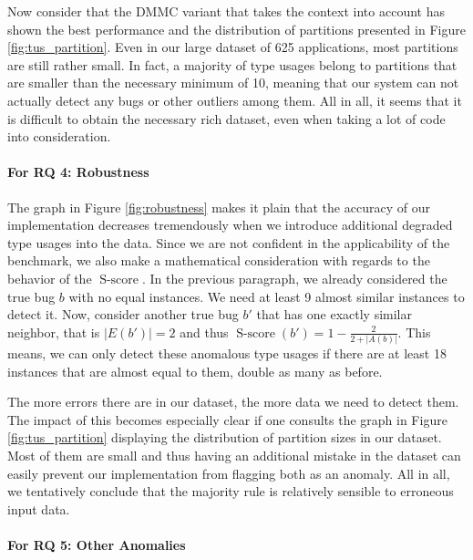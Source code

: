 Now consider that the $\text{DMMC}$ variant that takes the context into account has shown the best performance and the distribution of partitions presented in Figure \ref{fig:tus_partition}.
Even in our large dataset of 625 applications, most partitions are still rather small.
In fact, a majority of type usages belong to partitions that are smaller than the necessary minimum of 10, meaning that our system can not actually detect any bugs or other outliers among them.
All in all, it seems that it is difficult to obtain the necessary rich dataset, even when taking a lot of code into consideration.


\paragraph{For RQ 4: Robustness}

The graph in Figure \ref{fig:robustness}  makes it plain that the accuracy of our implementation decreases tremendously when we introduce additional degraded type usages into the data.
Since we are not confident in the applicability of the benchmark, we also make a mathematical consideration with regards to the behavior of the $\operatorname{S-score}$.
In the previous paragraph, we already considered the true bug $b$ with no equal instances.
We need at least 9 almost similar instances to detect it.
Now, consider another true bug $b'$ that has one exactly similar neighbor, that is $|E(b')|=2$ and thus $\operatorname{S-score}(b')=1-\frac{2}{2+|A(b)|}$.
This means, we can only detect these anomalous type usages if there are at least 18 instances that are almost equal to them, double as many as before.

The more errors there are in our dataset, the more data we need to detect them.
The impact of this becomes especially clear if one consults the graph in Figure \ref{fig:tus_partition} displaying the distribution of partition sizes in our dataset.
Most of them are small and thus having an additional mistake in the dataset can easily prevent our implementation from flagging both as an anomaly.
All in all, we tentatively conclude that the majority rule is relatively sensible to erroneous input data.

\paragraph{For RQ 5: Other Anomalies}

